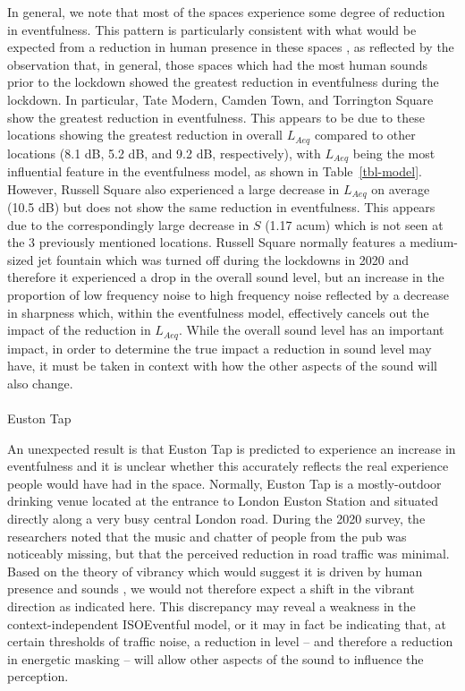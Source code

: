 \documentclass[
  authoryear,
  preprint,
  3p,
  onecolumn]{elsarticle}
\makeatletter
\let\oldparagraph\paragraph
\renewcommand{\paragraph}{
    \@ifstar
      \xxxParagraphStar
      \xxxParagraphNoStar
  }
\newcommand{\xxxParagraphStar}[1]{\oldparagraph*{#1}\mbox{}}
\newcommand{\xxxParagraphNoStar}[1]{\oldparagraph{#1}\mbox{}}
\makeatother
\begin{document}
In general, we note that most of the spaces experience some degree of
reduction in eventfulness. This pattern is particularly consistent with
what would be expected from a reduction in human presence in these
spaces \citep{Aletta2018Towards}, as reflected by the observation that,
in general, those spaces which had the most human sounds prior to the
lockdown showed the greatest reduction in eventfulness during the
lockdown. In particular, Tate Modern, Camden Town, and Torrington Square
show the greatest reduction in eventfulness. This appears to be due to
these locations showing the greatest reduction in overall \(L_{Aeq}\)
compared to other locations (8.1 dB, 5.2 dB, and 9.2 dB, respectively),
with \(L_{Aeq}\) being the most influential feature in the eventfulness
model, as shown in Table~\ref{tbl-model}. However, Russell Square also
experienced a large decrease in \(L_{Aeq}\) on average (10.5 dB) but
does not show the same reduction in eventfulness. This appears due to
the correspondingly large decrease in \(S\) (1.17 acum) which is not
seen at the 3 previously mentioned locations. Russell Square normally
features a medium-sized jet fountain which was turned off during the
lockdowns in 2020 and therefore it experienced a drop in the overall
sound level, but an increase in the proportion of low frequency noise to
high frequency noise reflected by a decrease in sharpness which, within
the eventfulness model, effectively cancels out the impact of the
reduction in \(L_{Aeq}\). While the overall sound level has an important
impact, in order to determine the true impact a reduction in sound level
may have, it must be taken in context with how the other aspects of the
sound will also change.

\paragraph{Euston Tap}\label{euston-tap}

An unexpected result is that Euston Tap is predicted to experience an
increase in eventfulness and it is unclear whether this accurately
reflects the real experience people would have had in the space.
Normally, Euston Tap is a mostly-outdoor drinking venue located at the
entrance to London Euston Station and situated directly along a very
busy central London road. During the 2020 survey, the researchers noted
that the music and chatter of people from the pub was noticeably
missing, but that the perceived reduction in road traffic was minimal.
Based on the theory of vibrancy which would suggest it is driven by
human presence and sounds \citep{Aletta2018Towards}, we would not
therefore expect a shift in the vibrant direction as indicated here.
This discrepancy may reveal a weakness in the context-independent
ISOEventful model, or it may in fact be indicating that, at certain
thresholds of traffic noise, a reduction in level -- and therefore a
reduction in energetic masking -- will allow other aspects of the sound
to influence the perception.
\end{document}
